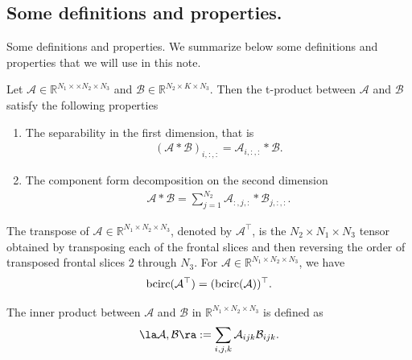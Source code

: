 \documentclass[aspectratio=169]{beamer}
\def\r{\right}
\def\bcirc{{\rm bcirc}}
\def\mcala{\mathcal A}
\def\mcalb{\mathcal B}
\def\mbbr{\mathbb R}
\newcommand{\beq}{\begin{equation}}\newcommand{\eeq}{\end{equation}}
\def\fm#1{\mathcal{#1}}
\def\r{\mathbb{R}}
\def\fm#1{\mathcal{#1}}
\def\r{\mathbb{R}}
\begin{document}
\subsection{Some definitions and properties.}
\begin{frame}{Some definitions and properties.}
We summarize below some definitions and properties that we will use in this note.
\begin{definition}
Let $\mcala \in \r^{N_1\times \times N_2 \times N_3}$ and $\mcalb \in \r^{N_2\times K\times N_3}$. Then the t-product between $\fm A $ and $\fm B$ satisfy the following properties
\begin{enumerate}
    \item The separability in the first dimension, that is 
    \begin{align*}
        \left( \fm A * \fm B\right)_{i, :, :} = \fm A_{i, :, :} * \fm B.
    \end{align*}
    \item  The component form decomposition on the second dimension
    \begin{align}
        \fm A * \fm B = \sum_{j=1}^{N_2} \fm A_{:, j, :} * \fm B_{j, :, :}.
    \end{align}
\end{enumerate}
\end{definition}
\end{frame}

\begin{frame}{}
\begin{definition}[transpose]
The transpose of $\mcala\in\mbbr^{N_1\times N_2\times N_3}$, denoted by $\mcala^\top$, is the $N_2\times N_1\times N_3$ tensor obtained by transposing each of the frontal slices and then reversing the order of transposed frontal slices $2$ through $N_3$.
For $\mcala\in\mbbr^{N_1\times N_2\times N_3}$, we have  \beq\label{ttop}\bcirc(\mcala^\top)=(\bcirc(\mcala))^\top.\eeq %
\end{definition}
\begin{definition}
The inner product between $\mcala$ and $\mcalb$ in $\mbbr^{N_1\times N_2\times N_3}$ is defined as $$\la\mcala,\mcalb\ra:=\sum_{i,j,k}\mcala_{ijk}\mcalb_{ijk}.$$ 
\end{definition}
\end{frame}
\end{document}
